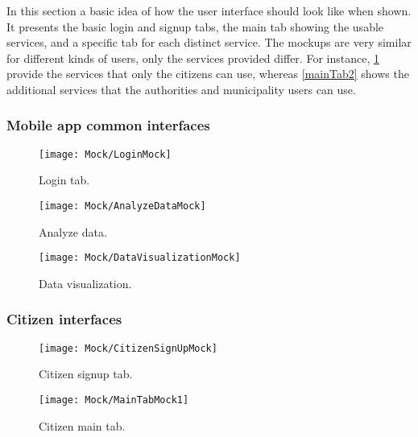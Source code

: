 In this section a basic idea of how the user interface should look like when shown. It presents the basic login and signup tabs, the main tab showing the usable services, and a specific tab for each distinct service. The mockups are very similar for different kinds of users, only the services provided differ. For instance, \ref{mainTab1} provide the services that only the citizens can use, whereas \ref{mainTab2} shows the additional services that the authorities and municipality users can use.

\subsubsection{Mobile app common interfaces}

\begin{figure}[H]
	\centering
	\begin{minipage}[b]{0.38\linewidth}
		\texttt{[image: Mock/LoginMock]}
	    \caption{Login tab.}
	\end{minipage}
	
\end{figure}

\begin{figure}[H]
	\centering
		\begin{minipage}[b]{0.38\linewidth}
		\texttt{[image: Mock/AnalyzeDataMock]}
		\caption{Analyze data.}
	\end{minipage}
	\begin{minipage}[b]{0.38\linewidth}
		\texttt{[image: Mock/DataVisualizationMock]}
		\caption{Data visualization.}
	\end{minipage}
\end{figure}

\subsubsection{Citizen interfaces}

\begin{figure}[H]
	\centering
	\begin{minipage}[b]{0.38\linewidth}
	    \texttt{[image: Mock/CitizenSignUpMock]}
	    \caption{Citizen signup tab.}
	\end{minipage}
	\begin{minipage}[b]{0.38\linewidth}
		\texttt{[image: Mock/MainTabMock1]}
		\caption{Citizen main tab.}
		\label{mainTab1}
	\end{minipage}
\end{figure}

